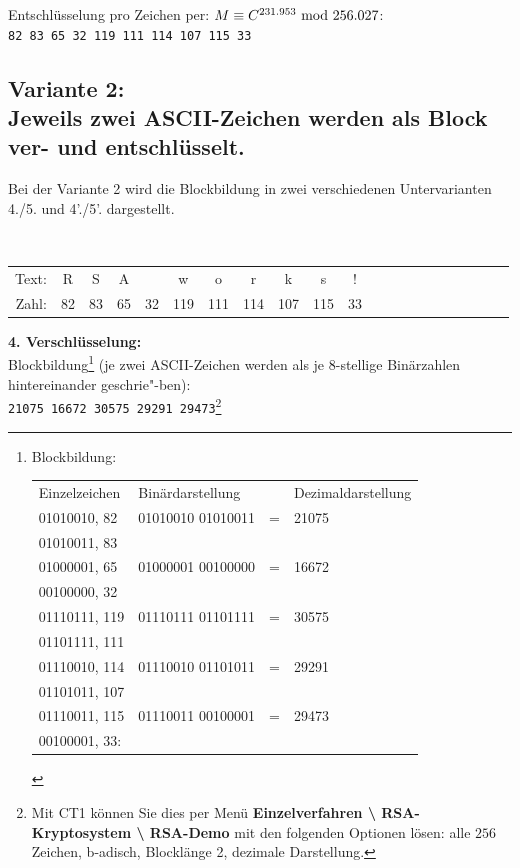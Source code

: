 \begin{refsegment}
 Entschlüsselung pro Zeichen per: $M \equiv C^{231.953}{\rm ~mod~}256.027$:\\
{\tt 82 83 65 32 119 111 114 107 115 33}\\


\subsection*{Variante 2:\\ Jeweils zwei ASCII-Zeichen werden als Block ver- und entschlüsselt.}

Bei der Variante 2 wird die Blockbildung in zwei verschiedenen Untervarianten 4./5. und 4'./5'. dargestellt.

{\tt
\begin{tabular}{rcccccccccccccccccccc}
{\rm Text:} & R & S & A &   & w & o & r & k & s & !\\
{\rm Zahl:} & 82 & 83 & 65 & 32 & 119 & 111 & 114 & 107 & 115 & 33
\end{tabular} } %

 \textbf{4. Verschlüsselung:}\\
Blockbildung\footnote{%
Blockbildung:\\ \tt \begin{tabular}{ll@{ }l@{ }l}
Einzelzeichen& Binärdarstellung  &&Dezimaldarstellung\\
01010010, 82 & 01010010 01010011 & = &21075\\
01010011, 83 &\\
01000001, 65 & 01000001 00100000 & = &16672\\
00100000, 32\\
01110111, 119 & 01110111 01101111 & = &30575\\
01101111, 111\\
01110010, 114 & 01110010 01101011 & = &29291\\
01101011, 107\\
01110011, 115 & 01110011 00100001 & = &29473\\
00100001, 33:
\end{tabular}
} (je zwei ASCII-Zeichen werden als je 8-stellige Binärzahlen hintereinander geschrie"-ben):\\
{\tt 21075 16672 30575 29291 29473}\footnote{%
Mit CT1 können Sie dies per Menü \textbf{Einzelverfahren \textbackslash{}
RSA-Kryptosystem \textbackslash{} RSA-Demo} mit den folgenden Optionen lösen: alle
$256$ Zeichen, b-adisch, Blocklänge 2, dezimale Darstellung.
}


\end{refsegment}
